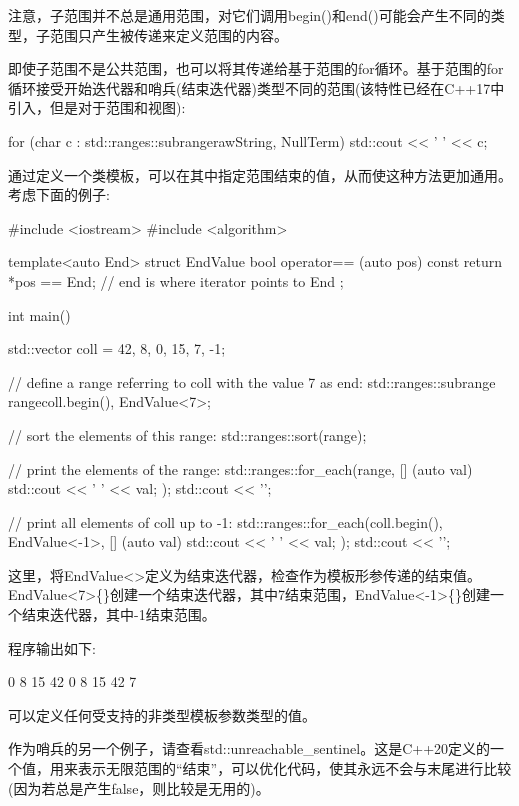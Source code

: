 注意，子范围并不总是通用范围，对它们调用begin()和end()可能会产生不同的类型，子范围只产生被传递来定义范围的内容。

即使子范围不是公共范围，也可以将其传递给基于范围的for循环。基于范围的for循环接受开始迭代器和哨兵(结束迭代器)类型不同的范围(该特性已经在C++17中引入，但是对于范围和视图):

\begin{cpp}
for (char c : std::ranges::subrange{rawString, NullTerm{}}) {
	std::cout << ' ' << c;
}
\end{cpp}

通过定义一个类模板，可以在其中指定范围结束的值，从而使这种方法更加通用。考虑下面的例子:


\begin{cpp}
#include <iostream>
#include <algorithm>

template<auto End>
struct EndValue {
	bool operator== (auto pos) const {
		return *pos == End; // end is where iterator points to End
	}
};

int main()
{
	std::vector coll = {42, 8, 0, 15, 7, -1};
	
	// define a range referring to coll with the value 7 as end:
	std::ranges::subrange range{coll.begin(), EndValue<7>{}};
	
	// sort the elements of this range:
	std::ranges::sort(range);
	
	// print the elements of the range:
	std::ranges::for_each(range,
						[] (auto val) {
							std::cout << ' ' << val;
						});
	std::cout << '\n';
	
	// print all elements of coll up to -1:
	std::ranges::for_each(coll.begin(), EndValue<-1>{},
							[] (auto val) {
								std::cout << ' ' << val;
							});
	std::cout << '\n';
}
\end{cpp}

这里，将EndValue<>定义为结束迭代器，检查作为模板形参传递的结束值。EndValue<7>\{\}创建一个结束迭代器，其中7结束范围，EndValue<-1>\{\}创建一个结束迭代器，其中-1结束范围。

程序输出如下:

\begin{shell}
0 8 15 42
0 8 15 42 7
\end{shell}

可以定义任何受支持的非类型模板参数类型的值。

作为哨兵的另一个例子，请查看std::unreachable\_sentinel。这是C++20定义的一个值，用来表示无限范围的“结束”，可以优化代码，使其永远不会与末尾进行比较(因为若总是产生false，则比较是无用的)。

